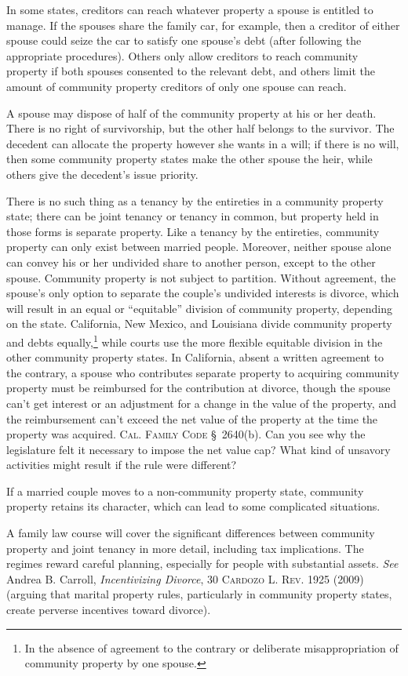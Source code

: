 In some states, creditors can reach whatever property a spouse is entitled to
manage. If the spouses share the family car, for example, then a creditor of
either spouse could seize the car to satisfy one spouse's debt (after following
the appropriate procedures). Others only allow creditors to reach community
property if both spouses consented to the relevant debt, and others limit the
amount of community property creditors of only one spouse can reach.

A spouse may dispose of half of the community property at his or her death.
There is no right of survivorship, but the other half belongs to the survivor.
The decedent can allocate the property however she wants in a will; if there is
no will, then some community property states make the other spouse the heir,
while others give the decedent's issue priority.

There is no such thing as a tenancy by the entireties in a community property
state; there can be joint tenancy or tenancy in common, but property held in
those forms is separate property. Like a tenancy by the entireties, community
property can only exist between married people. Moreover, neither spouse alone
can convey his or her undivided share to another person, except to the other
spouse. Community property is not subject to partition. Without agreement,
the spouse's only option to separate the couple's undivided interests is
divorce, which will result in an equal or ``equitable'' division of community
property, depending on the state. California, New Mexico, and Louisiana divide
community property and debts equally,\footnote{In the absence of agreement to
the contrary or deliberate misappropriation of community property by one
spouse.} while courts use the more flexible equitable division in the other
community property states. In California, absent a written agreement to the
contrary, a spouse who contributes separate property to acquiring community
property must be reimbursed for the contribution at divorce, though the spouse
can't get interest or an adjustment for a change in the value of the property,
and the reimbursement can't exceed the net value of the property at the time
the property was acquired. \textsc{Cal. Family Code} \S~2640(b). Can you see why
the legislature felt it necessary to impose the net value cap? What kind of
unsavory activities might result if the rule were different?

If a married couple moves to a non-community property state, community property
retains its character, which can lead to some complicated situations.

A family law course will cover the significant differences between community
property and joint tenancy in more detail, including tax implications. The
regimes reward careful planning, especially for people with substantial assets.
\textit{See} Andrea B. Carroll, \textit{Incentivizing Divorce}, 30
\textsc{Cardozo L. Rev.} 1925 (2009) (arguing that marital property rules,
particularly in community property states, create perverse incentives toward
divorce).

